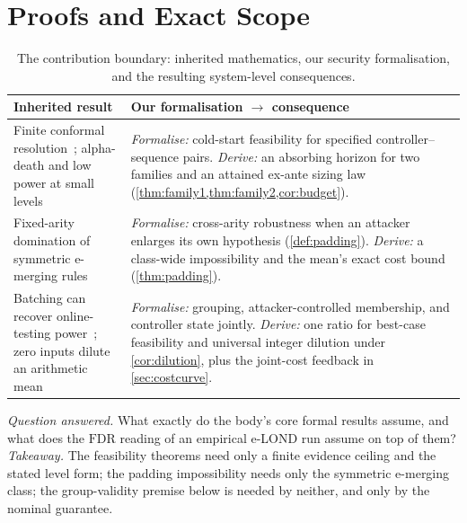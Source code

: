 \documentclass[conference]{IEEEtran}
\newcommand{\FDR}{\mathrm{FDR}}
\begin{document}
\section{Proofs and Exact Scope}\label{app:proofs}

\begin{table}[!t]
\centering
\caption{The contribution boundary: inherited mathematics, our security formalisation, and the
resulting system-level consequences.}
\label{tab:knownnew}
\scriptsize
\setlength{\tabcolsep}{4pt}
\begin{tabular}{@{}>{\raggedright\arraybackslash}p{2.55cm}>{\raggedright\arraybackslash}p{5.45cm}@{}}
\toprule
Inherited result & Our formalisation $\rightarrow$ consequence \\
\midrule
Finite conformal resolution~\cite{vovk2005alrw,hennhofer2026resolution,huo2024realtime}; alpha-death
and low power at small levels~\cite{foster2008alpha,ramdas2017lordpp} & \emph{Formalise:} cold-start
feasibility for specified controller--sequence pairs. \emph{Derive:} an absorbing horizon for two
families and an attained ex-ante sizing law (\cref{thm:family1,thm:family2,cor:budget}). \\[2pt]
Fixed-arity domination of symmetric e-merging rules~\cite{vovk2021evalues} & \emph{Formalise:}
cross-arity robustness when an attacker enlarges its own hypothesis (\cref{def:padding}).
\emph{Derive:} a class-wide impossibility and the mean's exact cost bound (\cref{thm:padding}). \\[2pt]
Batching can recover online-testing power~\cite{zrnic2020batching}; zero inputs dilute an arithmetic
mean & \emph{Formalise:} grouping, attacker-controlled membership, and controller state jointly.
\emph{Derive:} one ratio for best-case feasibility and universal integer dilution under
\cref{cor:dilution}, plus the joint-cost feedback in \cref{sec:costcurve}. \\
\bottomrule
\end{tabular}
\end{table}

\emph{Question answered.} What exactly do the body's core formal results assume, and what does the
$\FDR$ reading of an empirical e-LOND run assume on top of them? \emph{Takeaway.} The feasibility
theorems need only a finite evidence ceiling and the stated level form; the padding impossibility needs
only the symmetric e-merging class; the group-validity premise below is needed by neither, and only by
the nominal guarantee.
\end{document}
